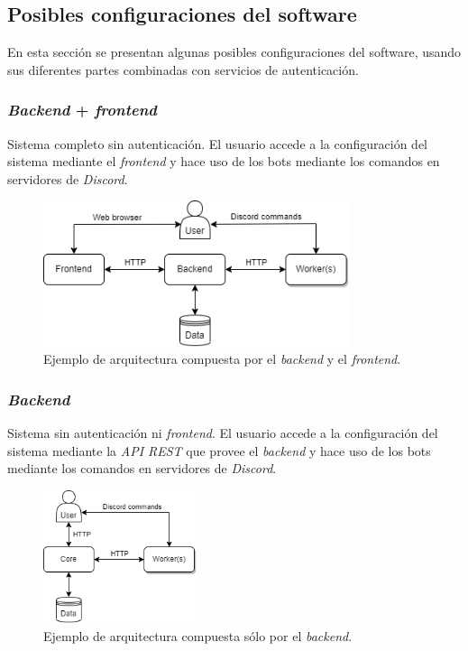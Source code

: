 \subsection{Posibles configuraciones del software}

En esta sección se presentan algunas posibles configuraciones del software, usando sus diferentes partes combinadas con servicios de autenticación.

\subsubsection{\textit{Backend} + \textit{frontend}}

Sistema completo sin autenticación. El usuario accede a la configuración del sistema mediante el \textit{frontend} y hace uso de los bots mediante los comandos en servidores de \textit{Discord}.

\begin{figure}[H]
	\centering
	\includegraphics[width=0.8\textwidth]{img/architecture_with_frontend.png}
	\caption{Ejemplo de arquitectura compuesta por el \textit{backend} y el \textit{frontend}.}
\end{figure}

\subsubsection{\textit{Backend}}

Sistema sin autenticación ni \textit{frontend}. El usuario accede a la configuración del sistema mediante la \textit{API REST} que provee el \textit{backend} y hace uso de los bots mediante los comandos en servidores de \textit{Discord}.

\begin{figure}[H]
	\centering
	\includegraphics[width=0.4\textwidth]{img/architecture_without_frontend.png}
	\caption{Ejemplo de arquitectura compuesta sólo por el \textit{backend}.}
\end{figure}

